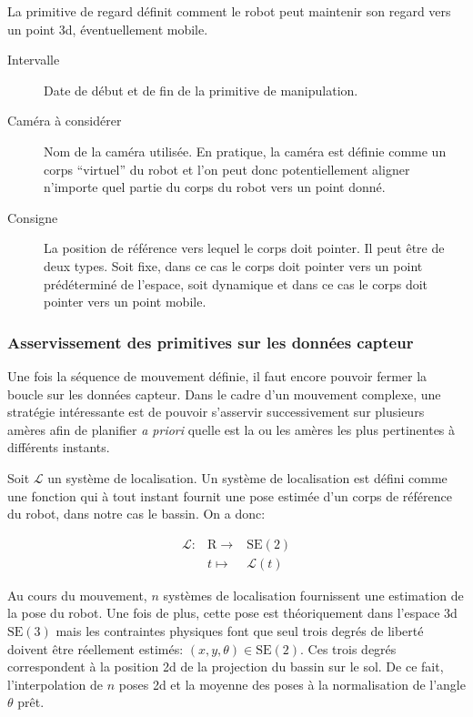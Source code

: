 La primitive de regard définit comment le robot peut maintenir son
regard vers un point 3d, éventuellement mobile.

\begin{description}
\item[Intervalle] Date de début et de fin de la primitive de manipulation.
\item[Caméra à considérer] Nom de la caméra utilisée. En pratique, la
  caméra est définie comme un corps ``virtuel'' du robot et l'on peut
  donc potentiellement aligner n'importe quel partie du corps du robot
  vers un point donné.
\item[Consigne] La position de référence vers lequel le corps doit
  pointer. Il peut être de deux types. Soit fixe, dans ce cas le corps
  doit pointer vers un point prédéterminé de l'espace, soit dynamique
  et dans ce cas le corps doit pointer vers un point mobile.
\end{description}


\subsubsection{Asservissement des primitives sur les données capteur}


Une fois la séquence de mouvement définie, il faut encore pouvoir
fermer la boucle sur les données capteur. Dans le cadre d'un mouvement
complexe, une stratégie intéressante est de pouvoir s'asservir
successivement sur plusieurs amères afin de planifier \emph{a priori}
quelle est la ou les amères les plus pertinentes à différents instants.


Soit $\mathcal{L}$ un système de localisation. Un système de
localisation est défini comme une fonction qui à tout instant fournit
une pose estimée d'un corps de référence du robot, dans notre cas le
bassin. On a donc:

\begin{equation}
  \begin{array}{ccc}
    \mathcal{L} : & \mathrm{R} \rightarrow & \text{SE}(2)\\
    ~ & t \mapsto & \mathcal{L}(t)
  \end{array}
\end{equation}

Au cours du mouvement, $n$ systèmes de localisation fournissent une
estimation de la pose du robot. Une fois de plus, cette pose est
théoriquement dans l'espace 3d $\text{SE}(3)$ mais les contraintes
physiques font que seul trois degrés de liberté doivent être
réellement estimés: $(x, y, \theta) \in \text{SE}(2)$. Ces trois
degrés correspondent à la position 2d de la projection du bassin sur
le sol. De ce fait, l'interpolation de $n$ poses 2d et la moyenne des
poses à la normalisation de l'angle $\theta$ prêt.


